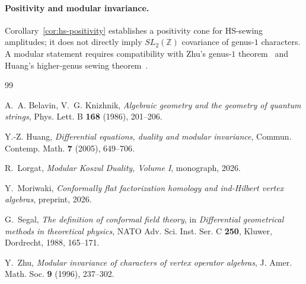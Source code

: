 \documentclass[11pt,reqno]{amsart}
\theoremstyle{definition}
\theoremstyle{remark}
\numberwithin{equation}{section}
\begin{document}
\paragraph{Positivity and modular invariance.}
Corollary~\ref{cor:hs-positivity} establishes a positivity
cone for HS-sewing amplitudes; it does not directly imply
$SL_2(\mathbb{Z})$ covariance of genus-$1$ characters. A modular
statement requires compatibility with Zhu's genus-$1$
theorem~\cite{Zhu96} and Huang's higher-genus sewing
theorem~\cite{Huang05}.

\begin{thebibliography}{99}

A.~A. Belavin, V.~G. Knizhnik,
\emph{Algebraic geometry and the geometry of quantum strings},
Phys. Lett. B \textbf{168} (1986), 201--206.

Y.-Z. Huang,
\emph{Differential equations, duality and modular invariance},
Commun. Contemp. Math. \textbf{7} (2005), 649--706.

R.~Lorgat,
\emph{Modular Koszul Duality, Volume I},
monograph, 2026.

Y.~Moriwaki,
\emph{Conformally flat factorization homology and ind-Hilbert
vertex algebras},
preprint, 2026.

G.~Segal,
\emph{The definition of conformal field theory},
in \emph{Differential geometrical methods in theoretical
physics}, NATO Adv. Sci. Inst. Ser. C \textbf{250}, Kluwer,
Dordrecht, 1988, 165--171.

Y.~Zhu,
\emph{Modular invariance of characters of vertex operator
algebras},
J. Amer. Math. Soc. \textbf{9} (1996), 237--302.

\end{thebibliography}
\end{document}

